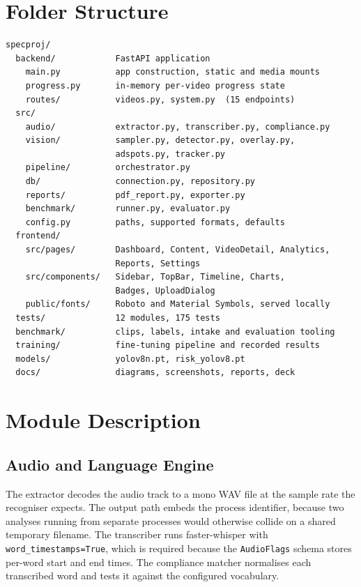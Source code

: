 \documentclass[
12pt,
a4paper,
oneside
]{report}
\begin{document}
\section{Folder Structure}

\begin{lstlisting}[caption={Repository layout}]
specproj/
  backend/            FastAPI application
    main.py           app construction, static and media mounts
    progress.py       in-memory per-video progress state
    routes/           videos.py, system.py  (15 endpoints)
  src/
    audio/            extractor.py, transcriber.py, compliance.py
    vision/           sampler.py, detector.py, overlay.py,
                      adspots.py, tracker.py
    pipeline/         orchestrator.py
    db/               connection.py, repository.py
    reports/          pdf_report.py, exporter.py
    benchmark/        runner.py, evaluator.py
    config.py         paths, supported formats, defaults
  frontend/
    src/pages/        Dashboard, Content, VideoDetail, Analytics,
                      Reports, Settings
    src/components/   Sidebar, TopBar, Timeline, Charts,
                      Badges, UploadDialog
    public/fonts/     Roboto and Material Symbols, served locally
  tests/              12 modules, 175 tests
  benchmark/          clips, labels, intake and evaluation tooling
  training/           fine-tuning pipeline and recorded results
  models/             yolov8n.pt, risk_yolov8.pt
  docs/               diagrams, screenshots, reports, deck
\end{lstlisting}

\section{Module Description}

\subsection{Audio and Language Engine}

The extractor decodes the audio track to a mono WAV file at the sample rate the
recogniser expects. The output path embeds the process identifier, because two
analyses running from separate processes would otherwise collide on a shared
temporary filename. The transcriber runs faster-whisper with
\texttt{word\_timestamps=True}, which is required because the
\texttt{AudioFlags} schema stores per-word start and end times. The compliance
matcher normalises each transcribed word and tests it against the configured
vocabulary.
\end{document}
